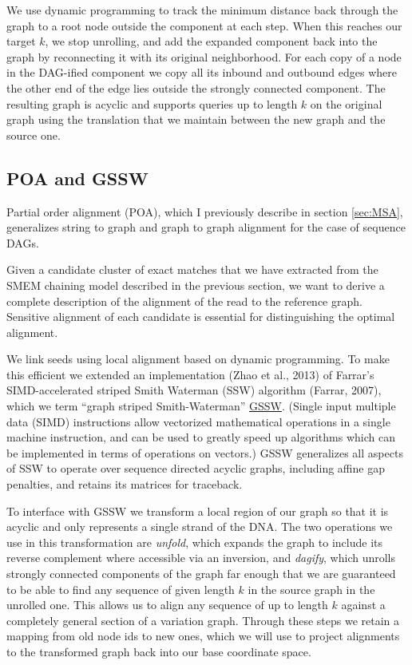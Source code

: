 We use dynamic programming to track the minimum distance back through the graph to a root node outside the component at each step.
When this reaches our target $k$, we stop unrolling, and add the expanded component back into the graph by reconnecting it with its original neighborhood.
For each copy of a node in the DAG-ified component we copy all its inbound and outbound edges where the other end of the edge lies outside the strongly connected component.
The resulting graph is acyclic and supports queries up to length $k$ on the original graph using the translation that we maintain between the new graph and the source one.


\subsection{POA and GSSW}

Partial order alignment (POA), which I previously describe in section \ref{sec:MSA}, generalizes string to graph and graph to graph alignment for the case of sequence DAGs.

Given a candidate cluster of exact matches that we have extracted from the SMEM chaining model described in 
the previous section,
we want to derive a complete description of the alignment of the read to the reference graph.
Sensitive alignment of each candidate is essential for distinguishing the optimal alignment.

We link seeds using local alignment based on dynamic programming. 
To make this efficient we extended an implementation (Zhao et al., 2013) of Farrar's SIMD-accelerated striped Smith Waterman (SSW) algorithm (Farrar, 2007), which we term ``graph striped Smith-Waterman'' \href{https://github.com/ekg/gssw}{GSSW}. (Single input multiple data (SIMD) instructions allow vectorized mathematical operations in a single machine instruction, and can be used to greatly speed up algorithms which can be implemented in terms of operations on vectors.)
GSSW generalizes all aspects of SSW to operate over sequence directed acyclic graphs, including affine gap penalties, and retains its matrices for traceback.

To interface with GSSW we transform a local region of our graph so that it is acyclic and only represents a single strand of the DNA. The two operations we use in this transformation are \emph{unfold}, which expands the graph to include its reverse complement where accessible via an inversion, and \emph{dagify}, which unrolls strongly connected components of the graph far enough that we are guaranteed to be able to find any sequence of given length $k$ in the source graph in the unrolled one.
This allows us to align any sequence of up to length $k$ against a completely general section of a variation graph.
Through these steps we retain a mapping from old node ids to new ones, which we will use to project alignments to the transformed graph back into our base coordinate space.

